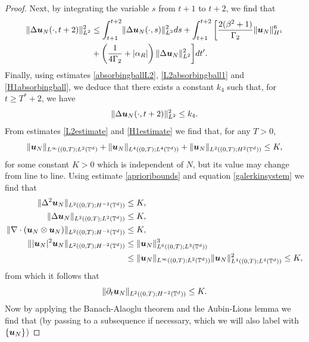 \documentclass[11pt]{amsart}
\newcommand{\bu}{\mbox{\boldmath$u$}}
\newcommand{\Rb}{\beta}
\newcommand{\Gamtwo}{\Gamma_{2}}
\theoremstyle{definition}
\numberwithin{equation}{section}
\numberwithin{equation}{section}
\begin{document}
\begin{proof}
Next, by integrating the variable $s$ from $t+1$ to $t+2$, we find that
\begin{align*}
\lVert \Delta \bu_N (\cdot, t+2) \rVert_{L^2}^2 &\leq \int_{t+1}^{t+2} \lVert \Delta \bu_N (\cdot, s) \rVert_{L^2}^2 ds + \int_{t+1}^{t+2} \bigg[ \frac{2 (\Rb^2 + 1)}{\Gamtwo}\lVert \bu_N \rVert_{H^1}^{6} \\
&+ \left( \frac{1}{4 \Gamtwo} + \lvert \alpha_{R} \rvert \right) \lVert \Delta \bu_N \rVert_{L^2}^2 \bigg] dt'.
\end{align*}
Finally, using estimates \eqref{absorbingballL2}, \eqref{L2absorbingball1} and \eqref{H1absorbingball}, we deduce that there exists a constant $k_4$ such that, for $t \geq T^* + 2$, we have
\begin{equation} \label{H2absorbingball}
\lVert \Delta \bu_N (\cdot, t+2) \rVert_{L^2}^2 \leq k_4.
\end{equation}
From estimates \eqref{L2estimate} and \eqref{H1estimate} we find that, for any $T>0$,
\begin{equation} \label{aprioribounds}
\lVert \bu_N \rVert_{L^\infty ((0,T); L^2 (\mathbb{T}^d)} + \lVert \bu_N \rVert_{L^4 ((0,T); L^4 (\mathbb{T}^d))} + \lVert \bu_N \rVert_{L^2 ((0,T); H^2 (\mathbb{T}^d))} \leq K,
\end{equation}
for some constant $K > 0$ which is independent of $N$, but its value may change from line to line. Using estimate \eqref{aprioribounds} and equation \eqref{galerkinsystem} we find that
\begin{align*}
\lVert \Delta^2 \bu_N \rVert_{L^2 ((0,T); H^{-2} (\mathbb{T}^d))} &\leq K, \\
\lVert \Delta \bu_N \rVert_{L^2 ((0,T); L^2 (\mathbb{T}^d))} &\leq K, \\
\lVert \nabla \cdot (\bu_N \otimes \bu_N) \rVert_{L^2 ((0,T); H^{-1} (\mathbb{T}^d))} &\leq K, \\
\lVert \lvert \bu_N \rvert^2 \bu_N \rVert_{L^2 ((0,T); H^{-2} (\mathbb{T}^d))} &\leq \lVert \bu_N \rVert_{L^6 ((0,T); L^3 (\mathbb{T}^d))}^3 \\
&\leq \lVert \bu_N \rVert_{L^\infty ((0,T); L^2 (\mathbb{T}^d))} \lVert \bu_N \rVert_{L^4 ((0,T); L^4 (\mathbb{T}^d))}^2 \leq K,
\end{align*}
from which it follows that
\begin{equation}
\lVert \partial_t \bu_N \rVert_{L^2 ((0,T); H^{-2} (\mathbb{T}^d))} \leq K.
\end{equation}
Now by applying the Banach-Alaoglu theorem and the Aubin-Lions lemma we find that (by passing to a subsequence if necessary, which we will also label with $\{ \bu_N \}$)

\end{proof}
\end{document}
